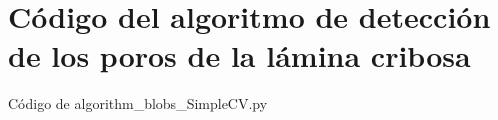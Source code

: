 \chapter{Código del algoritmo de detección de los poros de la lámina
  cribosa}

\begin{codigo_python}
\caption{Código de algorithm\_blobs\_SimpleCV.py}
  \inputminted[fontsize=\scriptsize, linenos, breaklines]{python}{../OpenCV/algorithm_blobs_SimpleCV.py}
\end{codigo_python}